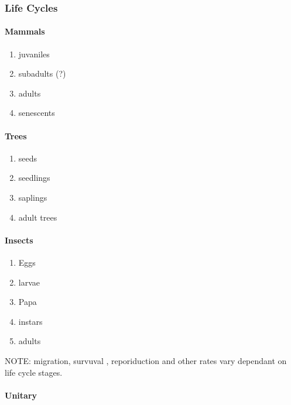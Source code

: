\documentclass[]{article}
\providecommand{\tightlist}{%
  \setlength{\itemsep}{0pt}\setlength{\parskip}{0pt}}
\let\oldparagraph\paragraph
\renewcommand{\paragraph}[1]{\oldparagraph{#1}\mbox{}}
\begin{document}
\hypertarget{life-cycles}{%
\subsubsection{Life Cycles}\label{life-cycles}}

\hypertarget{mammals}{%
\paragraph{Mammals}\label{mammals}}

\begin{enumerate}
\def\labelenumi{\arabic{enumi}.}
\tightlist
\item
  juvaniles
\item
  subadults (?)
\item
  adults
\item
  senescents
\end{enumerate}

\hypertarget{trees}{%
\paragraph{Trees}\label{trees}}

\begin{enumerate}
\def\labelenumi{\arabic{enumi}.}
\tightlist
\item
  seeds
\item
  seedlings
\item
  saplings
\item
  adult trees
\end{enumerate}

\hypertarget{insects}{%
\paragraph{Insects}\label{insects}}

\begin{enumerate}
\def\labelenumi{\arabic{enumi}.}
\tightlist
\item
  Eggs
\item
  larvae
\item
  Papa
\item
  instars
\item
  adults
\end{enumerate}

NOTE: migration, survuval , reporiduction and other rates vary dependant
on life cycle stages.

\hypertarget{unitary}{%
\paragraph{Unitary}\label{unitary}}
\end{document}
